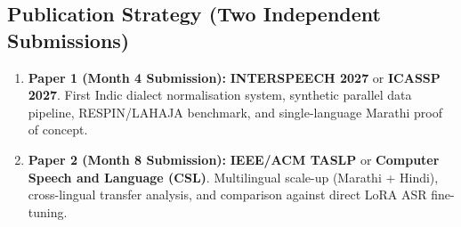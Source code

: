 \documentclass[11pt]{article}
\begin{document}
\subsection{Publication Strategy (Two Independent Submissions)}
\begin{enumerate}[leftmargin=*]
  \item \textbf{Paper 1 (Month 4 Submission):} \textbf{INTERSPEECH 2027} or \textbf{ICASSP 2027}. First Indic dialect normalisation system, synthetic parallel data pipeline, RESPIN/LAHAJA benchmark, and single-language Marathi proof of concept.
  \item \textbf{Paper 2 (Month 8 Submission):} \textbf{IEEE/ACM TASLP} or \textbf{Computer Speech and Language (CSL)}. Multilingual scale-up (Marathi + Hindi), cross-lingual transfer analysis, and comparison against direct LoRA ASR fine-tuning.
\end{enumerate}
\end{document}
